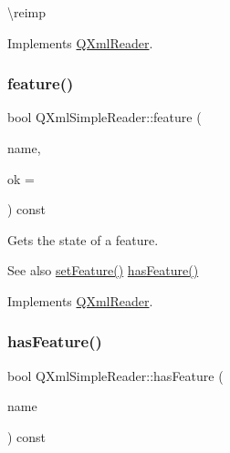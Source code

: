 \textbackslash{}reimp 

Implements \mbox{\hyperlink{class_q_xml_reader_aa347587bcc9e8b109aed2c5a41687901}{Q\+Xml\+Reader}}.

\mbox{\label{class_q_xml_simple_reader_ae6b1a973ea59fc35b75d45ac5e30a303}} 
\subsubsection{\texorpdfstring{feature()}{feature()}}
{\footnotesize\ttfamily bool Q\+Xml\+Simple\+Reader\+::feature (\begin{DoxyParamCaption}\item[{const \mbox{\hyperlink{class_q_string}{Q\+String}} \&}]{name,  }\item[{bool $\ast$}]{ok = {} }\end{DoxyParamCaption}) const\hspace{0.3cm}{\ttfamily [virtual]}}

Gets the state of a feature.

\begin{DoxySeeAlso}{See also}
\mbox{\hyperlink{class_q_xml_simple_reader_a7e435e46bfe139249be78d89a89ff629}{set\+Feature()}} \mbox{\hyperlink{class_q_xml_simple_reader_a6066183e6cbbab403e5cdf69a1410157}{has\+Feature()}} 
\end{DoxySeeAlso}


Implements \mbox{\hyperlink{class_q_xml_reader_ab4d90af8a5440668582f53e47e9a81d6}{Q\+Xml\+Reader}}.

\mbox{\label{class_q_xml_simple_reader_a6066183e6cbbab403e5cdf69a1410157}} 
\subsubsection{\texorpdfstring{hasFeature()}{hasFeature()}}
{\footnotesize\ttfamily bool Q\+Xml\+Simple\+Reader\+::has\+Feature (\begin{DoxyParamCaption}\item[{const \mbox{\hyperlink{class_q_string}{Q\+String}} \&}]{name }\end{DoxyParamCaption}) const\hspace{0.3cm}{\ttfamily [virtual]}}

